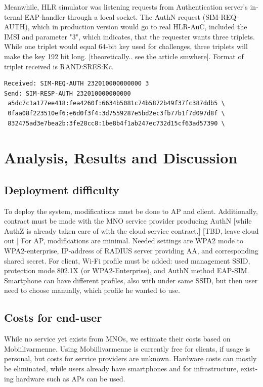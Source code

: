\documentclass[12pt,a4paper,english]{tutthesis}
\begin{document}
\begin{otherlanguage}{english}
{Meanwhile, HLR simulator was listening requests from Authentication
server's internal EAP-handler through a local socket.
The AuthN request (SIM-REQ-AUTH), which in production version would go
to real HLR-AuC, included the IMSI and parameter
"3", which indicates, that the requester wants three triplets. 
While one triplet would equal 64-bit key used for challenges, three
triplets will make the key 192 bit long. [theoretically.. see the
article smwhere].  Format of triplet received is RAND:SRES:Kc.

\scriptsize
\begin{verbatim}
Received: SIM-REQ-AUTH 232010000000000 3
Send: SIM-RESP-AUTH 232010000000000 
 a5dc7c1a177ee418:fea4260f:6634b5081c74b5872b49f37fc387ddb5 \
 0faa08f223510ef6:e6d0f3f4:3d7559287e5bd2ec3fb77b1f7d097d8f \
 832475ad3e7bea2b:3fe28cc8:1be8b4f1ab247ec732d15cf63ad57390 \
\end{verbatim}
\normalsize


\chapter{Analysis, Results and Discussion}
\label{sec-6}



\section{Deployment difficulty}
\label{sec-6-1}

To deploy the system, modifications must be done to AP and client.
Additionally, contract must be made with the MNO service
provider producing AuthN [while AuthZ is already taken care of with
the cloud service contract.]  [TBD, leave cloud out ]
For AP, modifications are minimal. Needed settings are
WPA2 mode to WPA2-enterprise, IP-address of RADIUS server providing 
AA, and corresponding shared secret.
For client, Wi-Fi profile must be added: used management SSID,
protection mode 802.1X (or WPA2-Enterprise), and AuthN method EAP-SIM.
Smartphone can have different profiles, also with under same SSID, but
then user need to choose manually, which profile he wanted to use.

\section{Costs for end-user}
\label{sec-6-2}
While no service yet exists from MNOs, we estimate their costs based
on Mobiilivarmenne. Using Mobiilivarmenne is currently free for
clients, if usage is personal, but costs for service providers are
unknown.  Hardware costs can mostly be eliminated, while users already
have smartphones and for infrastructure, existing hardware such as APs
can be used.

}
\end{otherlanguage}
\end{document}
